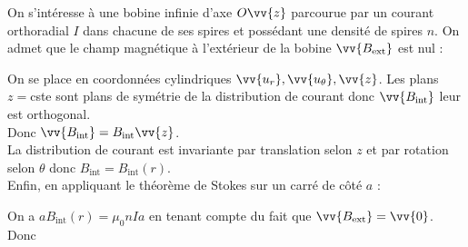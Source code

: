 ﻿\documentclass[a4paper]{article}
\begin{document}
\pagestyle{fancy}
\fancyhf{}
\setlength{\headheight}{15pt}

\begin{center}
	\large{}
\end{center}


On s'intéresse à une bobine infinie d'axe \(O\vv{z}\) parcourue par un courant orthoradial \(I\) dans chacune de ses spires et possédant une densité de spires \(n\).
On admet que le champ magnétique à l'extérieur de la bobine \(\vv{B_{\mathrm{ext}}}\) est nul :\begin{center}\end{center}
On se place en coordonnées cylindriques \(\vv{u_r},\vv{u_\theta},\vv{z}\).
Les plans \(z=\)cste sont plans de symétrie de la distribution de courant donc \(\vv{B_{\mathrm{int}}}\) leur est orthogonal.\\
Donc \(\vv{B_{\mathrm{int}}}=B_{\mathrm{int}}\vv{z}\).\\
La distribution de courant est invariante par translation selon \(z\) et par rotation selon \(\theta\) donc \(B_{\mathrm{int}}=B_{\mathrm{int}}(r)\).\\
Enfin, en appliquant le théorème de Stokes sur un carré de côté \(a\) :\begin{center}
\end{center}
On a \(aB_{\mathrm{int}}(r)=\mu_0nIa\) en tenant compte du fait que \(\vv{B_{\mathrm{ext}}}=\vv{0}\).
Donc \begin{center}\end{center}
\end{document}
